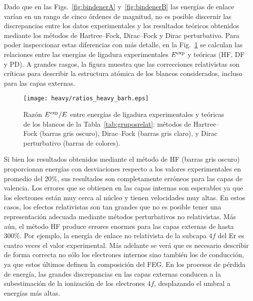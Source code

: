 Dado que en las Figs.~\ref{fig:bindenerA} y~\ref{fig:bindenerB} las 
energías de enlace varían en un rango de cinco órdenes de magnitud, no 
es posible discernir las discrepancias entre los datos experimentales y 
los resultados teóricos obtenidos mediante los métodos de Hartree--Fock, 
Dirac--Fock y Dirac perturbativo. Para poder inspeccionar estas 
diferencias con más detalle, en la Fig.~\ref{fig:ratios} se calculan las 
relaciones entre las energías de ligadura experimentales 
$E^{\mbox{\scriptsize exp}}$ y teóricas (HF, DF y PD). A grandes rasgos,
la figura muestra que las correcciones relativistas son críticas para 
describir la estructura atómica de los blancos considerados, incluso 
para las capas externas. 

\begin{figure}
\centering
\texttt{[image: heavy/ratios\_heavy\_barh.eps]} 
\caption[Razón $E^{\mbox{\scriptsize exp}}/E$ entre energías de ligadura 
experimentales y teóricas.]
{Razón $E^{\mbox{\scriptsize exp}}/E$ entre energías de ligadura 
experimentales y teóricas de los blancos de la 
Tabla~\ref{tab:gruposrelat}: métodos de Hartree--Fock (barras gris 
oscuro), Dirac--Fock (barras gris claro), y Dirac perturbativo (barras 
de colores).}
\label{fig:ratios}
\end{figure}

Si bien los resultados obtenidos mediante el método de HF (barras gris 
oscuro) proporcionan energías con desviaciones respecto a los valores 
experimentales en promedio del 20\%, sus resultados son completamente 
erróneos para las capas de valencia. Los errores que se obtienen en las 
capas internas son esperables ya que los electrones están muy cerca al 
núcleo y tienen velocidades muy altas. En estos casos, los efectos 
relativistas son tan grandes que no es posible tener una representación 
adecuada mediante métodos perturbativos no relativistas. Más aún, el 
método HF produce errores enormes para las capas externas de hasta 
300\%. Por ejemplo, la energía de enlace no relativista de la subcapa 
$4f$ del Er es cuatro veces el valor experimental. Más adelante se verá 
que es necesario describir de forma correcta no sólo los electrones 
internos sino también los de conducción, ya que estos últimos definen la 
composición del FEG. En los procesos de pérdida de energía, las grandes 
discrepancias en las capas externas conducen a la subestimación de la 
ionización de los electrones $4f$, desplazando el umbral a energías más 
altas.

